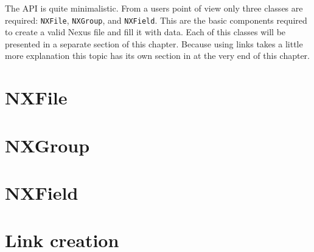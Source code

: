 
The API is quite minimalistic. From a users point of view only 
three classes are required: {\tt NXFile}, {\tt NXGroup}, and {\tt NXField}.
This are the basic components required to create a valid Nexus file and 
fill it with data. Each of this classes will be presented in a separate 
section of this chapter. 
Because using links takes a little more explanation this topic has 
its own section in at the very end of this chapter.

\section{NXFile}


\section{NXGroup}

\section{NXField}

\section{Link creation}